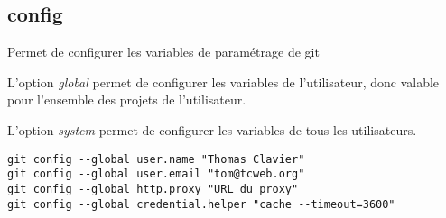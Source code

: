 \subsection*{config}

Permet de configurer les variables de paramétrage de git

L'option \textit{global} permet de configurer les variables de l'utilisateur, donc valable pour l'ensemble des projets de l'utilisateur.

L'option \textit{system} permet de configurer les variables de tous les utilisateurs.

\begin{verbatim}
git config --global user.name "Thomas Clavier"
git config --global user.email "tom@tcweb.org"
git config --global http.proxy "URL du proxy"
git config --global credential.helper "cache --timeout=3600"
\end{verbatim}

